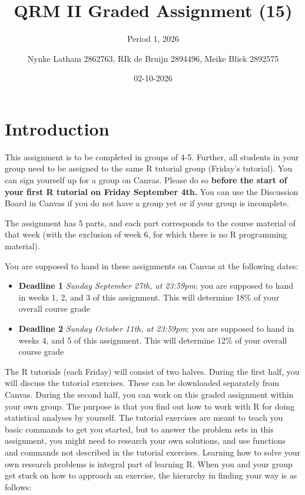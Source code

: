 \documentclass[
]{article}
\title{QRM II Graded Assignment (15)}
\subtitle{Period 1, 2026}
\author{Nynke Latham 2862763, RIk de Bruijn 2894496, Meike Bliek
2892575}
\date{02-10-2026}
\providecommand{\tightlist}{%
  \setlength{\itemsep}{0pt}\setlength{\parskip}{0pt}}
\begin{document}
\maketitle

\section{Introduction}\label{introduction}

This assignment is to be completed in groups of 4-5. Further, all
students in your group need to be assigned to the same R tutorial group
(Friday's tutorial). You can sign yourself up for a group on Canvas.
Please do so
\textbf{before the start of your first R tutorial on Friday September 4th.}
You can use the Discussion Board in Canvas if you do not have a group
yet or if your group is incomplete.

The assignment has 5 parts, and each part corresponds to the course
material of that week (with the exclusion of week 6, for which there is
no R programming material).

You are supposed to hand in these assignments on Canvas at the following
dates:

\begin{itemize}
\tightlist
\item
  \textbf{Deadline 1} \emph{Sunday September 27th, at 23:59pm}: you are
  supposed to hand in weeks 1, 2, and 3 of this assignment. This will
  determine 18\% of your overall course grade
\item
  \textbf{Deadline 2} \emph{Sunday October 11th, at 23:59pm}: you are
  supposed to hand in weeks 4, and 5 of this assignment. This will
  determine 12\% of your overall course grade
\end{itemize}

The R tutorials (each Friday) will consist of two halves. During the
first half, you will discuss the tutorial exercises. These can be
downloaded separately from Canvas. During the second half, you can work
on this graded assignment within your own group. The purpose is that you
find out how to work with R for doing statistical analyses by yourself.
The tutorial exercises are meant to teach you basic commands to get you
started, but to answer the problem sets in this assignment, you might
need to research your own solutions, and use functions and commands not
described in the tutorial exercises. Learning how to solve your own
research problems is integral part of learning R. When you and your
group get stuck on how to approach an exercise, the hierarchy in finding
your way is as follows:
\end{document}
